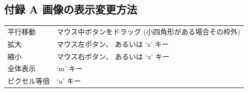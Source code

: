 \documentclass[a4paper,10pt]{article}
\begin{document}
\newpage

\subsection*{付録 A 画像の表示変更方法}

\setlength{\tabcolsep}{0em}
\renewcommand{\arraystretch}{1.0}
\noindent\begin{tabular}{p{8.5em}l}
平行移動 & マウス中ボタンをドラッグ (小四角形がある場合その枠外)\\
拡大 & マウス左ボタン、 あるいは ‘z' キー\\
縮小 & マウス右ボタン、 あるいは ‘x' キー\\
全体表示 & ‘m' キー\\
ピクセル等倍 & ‘n' キー\\
\end{tabular}
\end{document}
